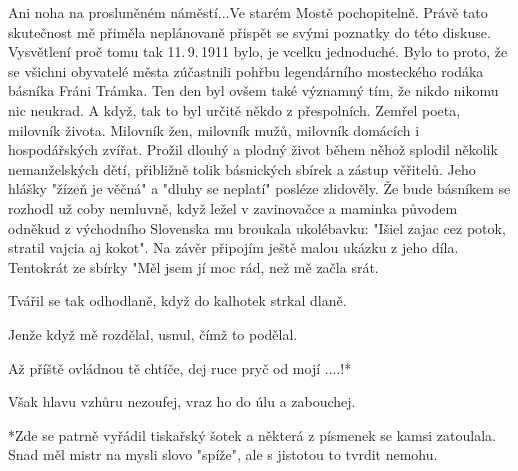 
Ani noha na prosluněném náměstí...Ve starém Mostě pochopitelně. Právě
tato skutečnost mě přiměla neplánovaně přispět se svými poznatky do
této diskuse. Vysvětlení proč tomu tak 11.\,9.\,1911 bylo, je vcelku
jednoduché. Bylo to proto, že se všichni obyvatelé města zúčastnili
pohřbu legendárního mosteckého rodáka básníka Fráni Trámka. Ten den
byl ovšem také významný tím, že nikdo nikomu nic neukrad. A když, tak
to byl určitě někdo z přespolních. Zemřel poeta, milovník života.
Milovník žen, milovník mužů, milovník domácích i hospodářských zvířat.
Prožil dlouhý a plodný život během něhož splodil několik nemanželských
dětí, přibližně tolik básnických sbírek a zástup věřitelů. Jeho hlášky
"žízeň je věčná" a "dluhy se neplatí" posléze zlidověly. Že bude
básníkem se rozhodl už coby nemluvně, když ležel v zavinovačce a
maminka původem odněkud z východního Slovenska mu broukala ukolébavku:
"Išiel zajac cez potok, stratil vajcia aj kokot". Na závěr připojím
ještě malou ukázku z jeho díla. Tentokrát ze sbírky "Měl jsem jí moc
rád, než mě začla srát.

Tvářil se tak odhodlaně, když do kalhotek strkal dlaně.

Jenže když mě rozdělal, usnul, čímž to podělal.

Až příště ovládnou tě chtíče, dej ruce pryč od mojí ....!*

Však hlavu vzhůru nezoufej, vraz ho do úlu a zabouchej.

*Zde se patrně vyřádil tiskařský šotek a některá z písmenek se kamsi zatoulala. Snad měl mistr na mysli slovo "spíže", ale s jistotou to tvrdit nemohu.


